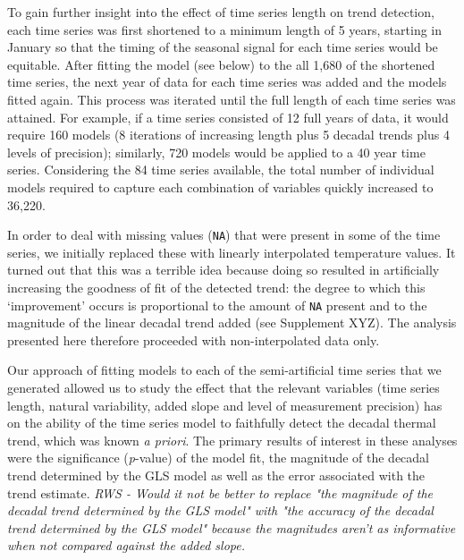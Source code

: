 \documentclass{ametsoc}
\begin{document}
To gain further insight into the effect of time series length on trend detection, each time series was first shortened to a minimum length of 5 years, starting in January so that the timing of the seasonal signal for each time series would be equitable. After fitting the model (see below) to the all 1,680 of the shortened time series, the next year of data for each time series was added and the models fitted again. This process was iterated until the full length of each time series was attained. For example, if a time series consisted of 12 full years of data, it would require 160 models (8 iterations of increasing length plus 5 decadal trends plus 4 levels of precision); similarly, 720 models would be applied to a 40 year time series. Considering the 84 time series available, the total number of individual models required to capture each combination of variables quickly increased to 36,220.

In order to deal with missing values (\texttt{NA}) that were present in some of the time series, we initially replaced these with linearly interpolated temperature values. It turned out that this was a terrible idea because doing so resulted in artificially increasing the goodness of fit of the detected trend: the degree to which this `improvement' occurs is proportional to the amount of \texttt{NA} present and to the magnitude of the linear decadal trend added (see Supplement XYZ). The analysis presented here therefore proceeded with non-interpolated data only.

Our approach of fitting models to each of the semi-artificial time series that we generated allowed us to study the effect that the relevant variables (time series length, natural variability, added slope and level of measurement precision) has on the ability of the time series model to faithfully detect the decadal thermal trend, which was known \emph{a priori}. The primary results of interest in these analyses were the significance (\emph{p}-value) of the model fit, the magnitude of the decadal trend determined by the GLS model as well as the error associated with the trend estimate. 
\emph{RWS - Would it not be better to replace "the magnitude of the decadal trend determined by the GLS model" with "the accuracy of the decadal trend determined by the GLS model" because the magnitudes aren't as informative when not compared against the added slope.}
\end{document}
